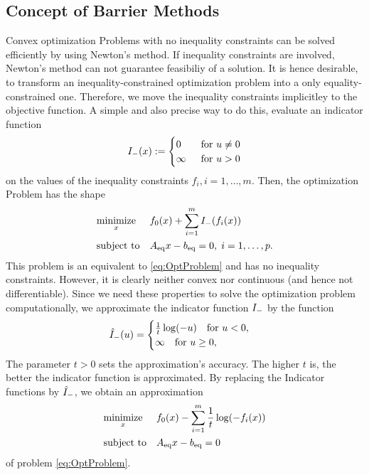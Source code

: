 \subsection{Concept of Barrier Methods}
Convex optimization Problems with no inequality constraints can  be solved efficiently by using Newton's method. If inequality constraints are involved, Newton's method can not guarantee feasibiliy of a solution. It is hence desirable, to transform an inequality-constrained optimization problem into a only equality-constrained one. Therefore, we move the inequality constraints implicitley to the objective function.
\todo A simple and also precise way to do this, evaluate an  indicator function  
\begin{align}
	{I}_{\mathrm{-}} (x) :=
	\begin{cases}
		0 \quad &\text{for } u \neq 0\\
		\infty &\text{for } u > 0
	\end{cases}
\end{align}
on the values of the inequality constraints $ f_i, i=1,\dots,m $. Then, the optimization Problem has the shape
\begin{align}
	\begin{aligned}
	& \underset{x}{\text{minimize}}
	& & f_0(x) + \sum_{i=1}^{m} {I}_{\mathrm{-}}(f_i(x))\\
	& \text{subject to}
	& & {A}_{\mathrm{eq}} x - {b}_{\mathrm{eq}} = 0, \; i = 1,\dots, p.
	\end{aligned} \label{eq:ifctProblem}
\end{align}
This problem is an equivalent to \eqref{eq:OptProblem} and has no inequality constraints. However, it is clearly neither convex nor continuous (and hence not differentiable). Since we need these properties to solve the optimization problem computationally, we approximate the indicator function $ {I}_{\mathrm{-}} $ by the function
\begin{equation}
	{\hat{I}}_{\mathrm{-}} (u) =
	\begin{cases}
	 \frac{1}{t}\log(-u) \quad \text{for } u < 0,\\
	 \infty \quad \text{for } u\geq 0,
	\end{cases}
\end{equation}
The parameter $ t>0 $ sets the approximation's accuracy. The higher $ t $ is, the better the indicator function is approximated.
By replacing the Indicator functions by $ {\hat{I}}_{\mathrm{-}} $, we obtain an
approximation 
\begin{equation}
\begin{aligned}
& \underset{x}{\text{minimize}}
& & f_0(x) - \sum_{i=1}^{m} \frac{1}{t} \log(-f_i(x)) \\
& \text{subject to}
& & {A}_{\mathrm{eq}} x - {b}_{\mathrm{eq}} = 0
\end{aligned} \label{eq:ApproxProblem}
\end{equation}
of problem \eqref{eq:OptProblem}.

